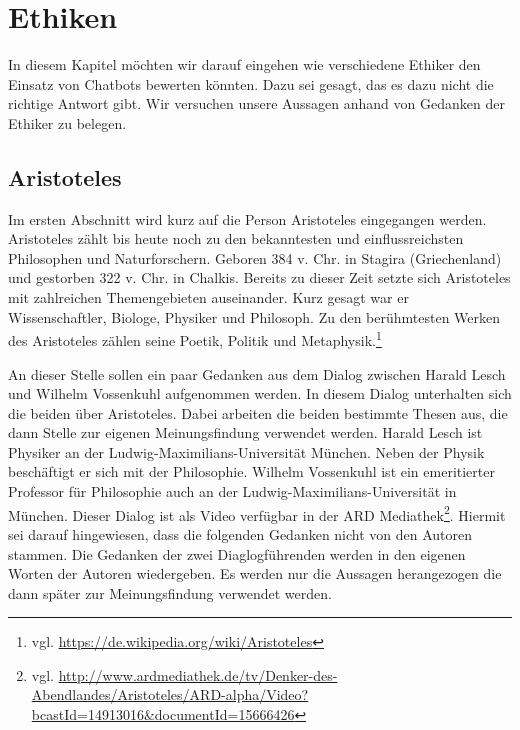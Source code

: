 \section{Ethiken}
In diesem Kapitel möchten wir darauf eingehen wie verschiedene Ethiker den Einsatz von Chatbots bewerten könnten. Dazu sei gesagt, das es dazu nicht die richtige Antwort gibt. Wir versuchen unsere Aussagen anhand von Gedanken der Ethiker zu belegen. 

\subsection{Aristoteles}
Im ersten Abschnitt wird kurz auf die Person Aristoteles eingegangen werden. \newline
Aristoteles zählt bis heute noch zu den bekanntesten und einflussreichsten Philosophen und Naturforschern. Geboren 384 v. Chr. in Stagira (Griechenland) und gestorben 322 v. Chr. in Chalkis. Bereits zu dieser Zeit setzte sich Aristoteles mit zahlreichen Themengebieten auseinander. Kurz gesagt war er Wissenschaftler, Biologe, Physiker und Philosoph. Zu den berühmtesten Werken des Aristoteles zählen seine Poetik, Politik und Metaphysik.\footnote{vgl. \url{https://de.wikipedia.org/wiki/Aristoteles}}



An dieser Stelle sollen ein paar Gedanken aus dem Dialog zwischen Harald Lesch und Wilhelm Vossenkuhl aufgenommen werden. In diesem Dialog unterhalten sich die beiden über Aristoteles. Dabei arbeiten die beiden bestimmte Thesen aus, die dann Stelle zur eigenen Meinungsfindung verwendet werden. Harald Lesch ist Physiker an der Ludwig-Maximilians-Universität München. Neben der Physik beschäftigt er sich mit der Philosophie. Wilhelm Vossenkuhl ist ein emeritierter Professor für Philosophie auch an der Ludwig-Maximilians-Universität in München. Dieser Dialog ist als Video verfügbar in der ARD Mediathek\footnote{vgl. \url{http://www.ardmediathek.de/tv/Denker-des-Abendlandes/Aristoteles/ARD-alpha/Video?bcastId=14913016&documentId=15666426}}. Hiermit sei darauf hingewiesen, dass die folgenden Gedanken nicht von den Autoren stammen. Die Gedanken der zwei Diaglogführenden werden in den eigenen Worten der Autoren wiedergeben. Es werden nur die Aussagen herangezogen die dann später zur Meinungsfindung verwendet werden.


